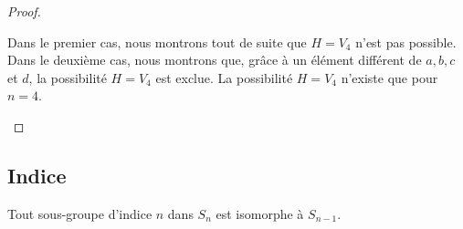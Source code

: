 \begin{proof}
\begin{subproof}
\begin{subproof}
			\spitem[Pourquoi \( n=4\) est spécial ?]

			Dans le premier cas, nous montrons tout de suite que \( H=V_4\) n'est pas possible. Dans le deuxième cas, nous montrons que, grâce à un élément différent de \( a,b,c\) et \( d\), la possibilité \( H=V_4\) est exclue. La possibilité \( H=V_4\) n'existe que pour \( n=4\).

		\end{subproof}
	\end{subproof}

\end{proof}

\subsection{Indice}

\begin{theorem}     \label{THOooXDRNooIyaGlv}
	Tout sous-groupe d'indice \( n\) dans \( S_n\) est isomorphe à \( S_{n-1}\).
\end{theorem}

